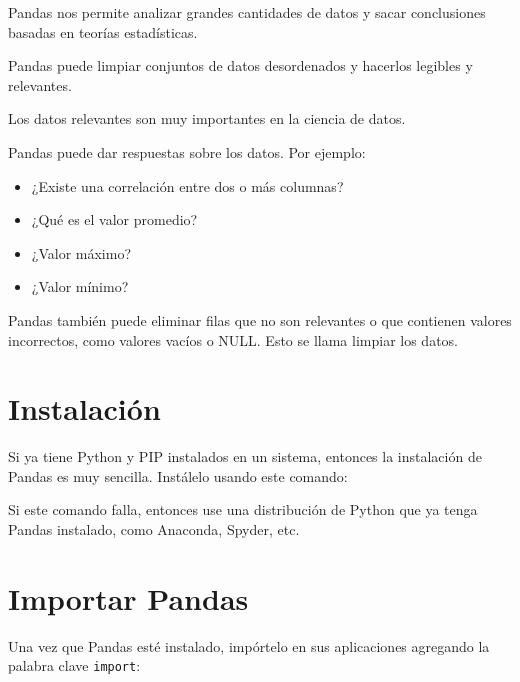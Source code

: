 Pandas nos permite analizar grandes cantidades de datos y sacar
conclusiones basadas en teorías estadísticas.

Pandas puede limpiar conjuntos de datos desordenados y hacerlos legibles
y relevantes.

Los datos relevantes son muy importantes en la ciencia de datos.

Pandas puede dar respuestas sobre los datos. Por ejemplo:

\begin{itemize}
  \item ¿Existe una correlación entre dos o más columnas?
  \item ¿Qué es el valor promedio?
  \item ¿Valor máximo?
  \item ¿Valor mínimo?
\end{itemize}

Pandas también puede eliminar filas que no son relevantes o que
contienen valores incorrectos, como valores vacíos o NULL. Esto se llama
limpiar los datos.

\section{Instalación} 
Si ya tiene Python y PIP instalados en un sistema, entonces la
instalación de Pandas es muy sencilla. Instálelo usando este comando:

\begin{Shaded}
\begin{Highlighting}[]
\ExtensionTok{$}
\end{Highlighting}
\end{Shaded}

Si este comando falla, entonces use una distribución de Python que ya
tenga Pandas instalado, como Anaconda, Spyder, etc.

\section{Importar Pandas}

Una vez que Pandas esté instalado, impórtelo en sus aplicaciones
agregando la palabra clave \texttt{import}:

\begin{Shaded}
\begin{Highlighting}[]
\end{Highlighting}
\end{Shaded}

